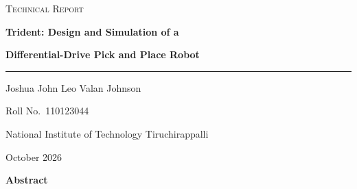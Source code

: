 \thispagestyle{empty}
\begin{center}
  \vspace*{1.2em}
  {\small\scshape\color{accent} Technical Report\par}
  \vspace{0.9em}
  {\LARGE\bfseries\color{ink} Trident: Design and Simulation of a\par}
  \vspace{0.3em}
  {\LARGE\bfseries\color{ink} Differential-Drive Pick and Place Robot\par}
  \vspace{1.0em}
  {\color{rule}\rule{0.35\linewidth}{0.6pt}\par}
  \vspace{1.2em}
  {\large Joshua John Leo Valan Johnson\par}
  \vspace{0.3em}
  Roll No.\ 110123044\par
  National Institute of Technology Tiruchirappalli\par
  \vspace{1.0em}
  October 2026\par
  \vspace{1.6em}
  {\large\bfseries\color{ink} Abstract\par}
\end{center}
\vspace{0.2em}

